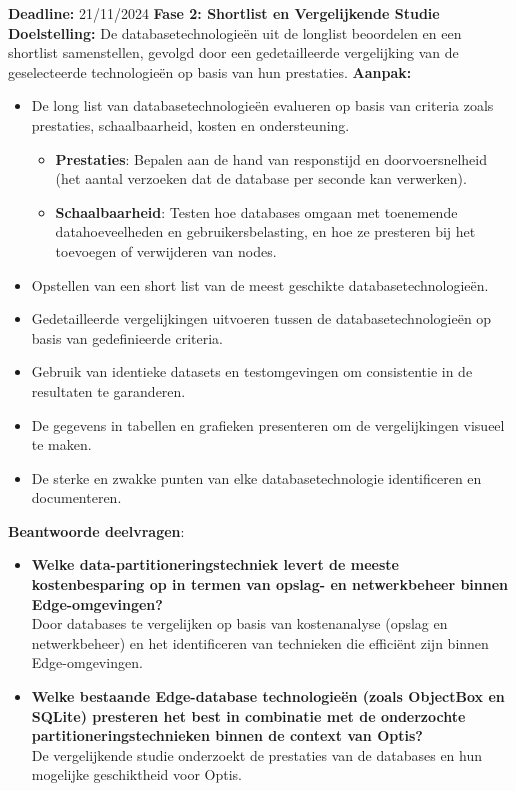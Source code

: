     \textbf{Deadline:} 21/11/2024\newline\newline
\textbf{Fase 2: Shortlist en Vergelijkende Studie}\newline\newline
    \textbf{Doelstelling:} De databasetechnologieën uit de longlist beoordelen en een shortlist samenstellen, gevolgd door een gedetailleerde vergelijking van de geselecteerde technologieën op basis van hun prestaties.\newline\newline
    \textbf{Aanpak:}
    \begin{itemize}
        \item De long list van databasetechnologieën evalueren op basis van criteria zoals prestaties, schaalbaarheid, kosten en ondersteuning.
        \begin{itemize}
          \item \textbf{Prestaties}: Bepalen aan de hand van responstijd en doorvoersnelheid (het aantal verzoeken dat de database per seconde kan verwerken).
          \item \textbf{Schaalbaarheid}: Testen hoe databases omgaan met toenemende datahoeveelheden en gebruikersbelasting, en hoe ze presteren bij het toevoegen of verwijderen van nodes.
        \end{itemize}
        \item Opstellen van een short list van de meest geschikte databasetechnologieën.
        \item Gedetailleerde vergelijkingen uitvoeren tussen de databasetechnologieën op basis van gedefinieerde criteria.

        \item Gebruik van identieke datasets en testomgevingen om consistentie in de resultaten te garanderen.
        \item De gegevens in tabellen en grafieken presenteren om de vergelijkingen visueel te maken.
        \item De sterke en zwakke punten van elke databasetechnologie identificeren en documenteren.
    \end{itemize}
    \textbf{Beantwoorde deelvragen}:
    \begin{itemize}
    \item \textbf{Welke data-partitioneringstechniek levert de meeste kostenbesparing op in termen van opslag- en netwerkbeheer binnen Edge-omgevingen?} \\
      Door databases te vergelijken op basis van kostenanalyse (opslag en netwerkbeheer) en het identificeren van technieken die efficiënt zijn binnen Edge-omgevingen.
    \item \textbf{Welke bestaande Edge-database technologieën (zoals ObjectBox en SQLite) presteren het best in combinatie met de onderzochte partitioneringstechnieken binnen de context van Optis?} \\
      De vergelijkende studie onderzoekt de prestaties van de databases en hun mogelijke geschiktheid voor Optis.
    \end{itemize}

